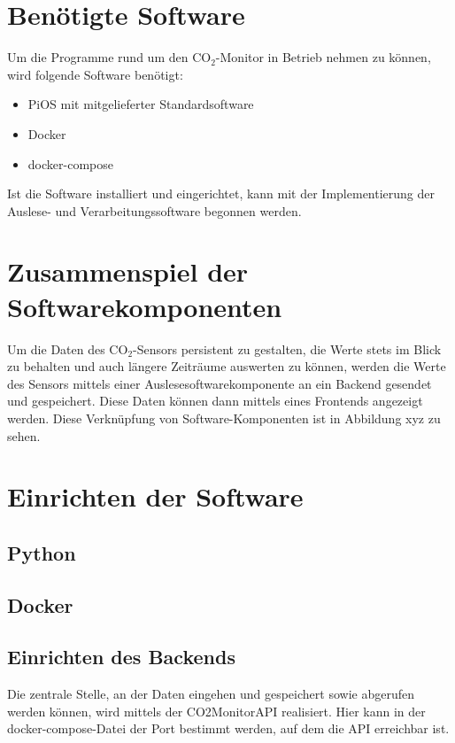 \documentclass[a4paper,
    11pt,
    headings=small,
    ngerman,
    listof=totoc,
    numbers=noenddot]{scrreprt}[2021/11/13]
\begin{document}
\section{Benötigte Software}

Um die Programme rund um den CO$_2$-Monitor in Betrieb nehmen zu können, wird folgende Software benötigt:

\begin{itemize}
  \item PiOS mit mitgelieferter Standardsoftware
  \item Docker
  \item docker-compose
\end{itemize}

Ist die Software installiert und eingerichtet, kann mit der Implementierung der Auslese- und Verarbeitungssoftware begonnen werden.


\section{Zusammenspiel der Softwarekomponenten}


Um die Daten des CO$_2$-Sensors persistent zu gestalten, die Werte stets im Blick zu behalten und auch längere Zeiträume auswerten zu können, werden die Werte des Sensors mittels einer Auslesesoftwarekomponente an ein Backend gesendet und gespeichert. Diese Daten können dann mittels eines Frontends angezeigt werden. Diese Verknüpfung von Software-Komponenten ist in Abbildung xyz %
zu sehen.


\section{Einrichten der Software}

\subsection{Python}

\subsection{Docker}

\subsection{Einrichten des Backends}

Die zentrale Stelle, an der Daten eingehen und gespeichert sowie abgerufen werden können, wird mittels der CO2MonitorAPI realisiert. Hier kann in der docker-compose-Datei der Port bestimmt werden, auf dem die \ac{API} erreichbar ist.
\end{document}
